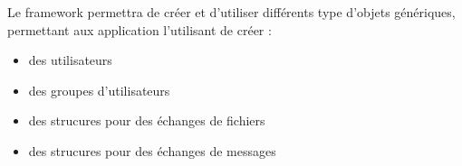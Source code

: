 Le framework permettra de créer et d'utiliser différents type d'objets génériques, permettant aux application l'utilisant de créer :

\begin{itemize}
\item{des utilisateurs}
\item{des groupes d'utilisateurs}
\item{des strucures pour des échanges de fichiers}
\item{des strucures pour des échanges de messages}
\end{itemize}

